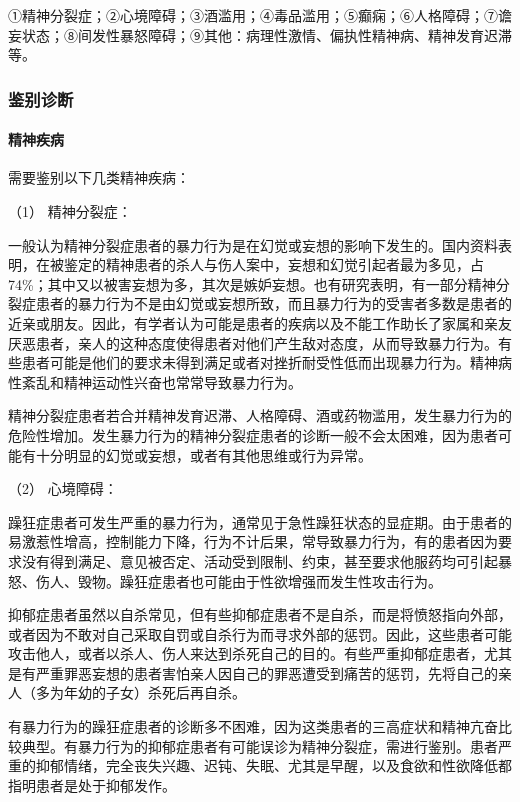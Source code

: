 ①精神分裂症；②心境障碍；③酒滥用；④毒品滥用；⑤癫痫；⑥人格障碍；⑦谵妄状态；⑧间发性暴怒障碍；⑨其他：病理性激情、偏执性精神病、精神发育迟滞等。

\subsubsection{鉴别诊断}

\paragraph{精神疾病}

需要鉴别以下几类精神疾病：

\hypertarget{text00054.htmlux5cux23CHP1-18-12-2-1-1}{}
（1） 精神分裂症：

一般认为精神分裂症患者的暴力行为是在幻觉或妄想的影响下发生的。国内资料表明，在被鉴定的精神患者的杀人与伤人案中，妄想和幻觉引起者最为多见，占74\%；其中又以被害妄想为多，其次是嫉妒妄想。也有研究表明，有一部分精神分裂症患者的暴力行为不是由幻觉或妄想所致，而且暴力行为的受害者多数是患者的近亲或朋友。因此，有学者认为可能是患者的疾病以及不能工作助长了家属和亲友厌恶患者，亲人的这种态度使得患者对他们产生敌对态度，从而导致暴力行为。有些患者可能是他们的要求未得到满足或者对挫折耐受性低而出现暴力行为。精神病性紊乱和精神运动性兴奋也常常导致暴力行为。

精神分裂症患者若合并精神发育迟滞、人格障碍、酒或药物滥用，发生暴力行为的危险性增加。发生暴力行为的精神分裂症患者的诊断一般不会太困难，因为患者可能有十分明显的幻觉或妄想，或者有其他思维或行为异常。

\hypertarget{text00054.htmlux5cux23CHP1-18-12-2-1-2}{}
（2） 心境障碍：

躁狂症患者可发生严重的暴力行为，通常见于急性躁狂状态的显症期。由于患者的易激惹性增高，控制能力下降，行为不计后果，常导致暴力行为，有的患者因为要求没有得到满足、意见被否定、活动受到限制、约束，甚至要求他服药均可引起暴怒、伤人、毁物。躁狂症患者也可能由于性欲增强而发生性攻击行为。

抑郁症患者虽然以自杀常见，但有些抑郁症患者不是自杀，而是将愤怒指向外部，或者因为不敢对自己采取自罚或自杀行为而寻求外部的惩罚。因此，这些患者可能攻击他人，或者以杀人、伤人来达到杀死自己的目的。有些严重抑郁症患者，尤其是有严重罪恶妄想的患者害怕亲人因自己的罪恶遭受到痛苦的惩罚，先将自己的亲人（多为年幼的子女）杀死后再自杀。

有暴力行为的躁狂症患者的诊断多不困难，因为这类患者的三高症状和精神亢奋比较典型。有暴力行为的抑郁症患者有可能误诊为精神分裂症，需进行鉴别。患者严重的抑郁情绪，完全丧失兴趣、迟钝、失眠、尤其是早醒，以及食欲和性欲降低都指明患者是处于抑郁发作。

